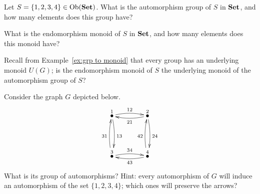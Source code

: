 \documentclass[CT4S-EN-RU]{subfiles}
\begin{document}
\begin{exampleRUS}
\end{exampleRUS}

\begin{exerciseENG}
Let $S=\{1,2,3,4\}\in\textnormal{Ob}({\mathbf{Set}})$.
\sexc What is the automorphism group of $S$ in ${\mathbf{Set}}$, and how many elements does this group have?
\item What is the endomorphism monoid of $S$ in ${\mathbf{Set}}$, and how many elements does this monoid have? 
\item Recall from Example~\ref{ex:grp to monoid} that every group has an underlying monoid $U(G)$; is the endomorphism monoid of $S$ the underlying monoid of the automorphism group of $S$?
\endsexc
\end{exerciseENG}

\begin{exerciseRUS}
\end{exerciseRUS}

\begin{exerciseENG}\label{exc:symmetric square}
Consider the graph $G$ depicted below. 
$$
\xymatrix@=40pt{
\LMO{1}\ar@/^.3pc/[r]^{12}\ar@/^.3pc/[d]^{13}&\LMO{2}\ar@/^.3pc/[d]^{24}\ar@/^.3pc/[l]^{21}\\
\LMO{3}\ar@/^.3pc/[r]^{34}\ar@/^.3pc/[u]^{31}&\LMO{4}\ar@/^.3pc/[u]^{42}\ar@/^.3pc/[l]^{43}
}
$$
What is its group of automorphisms? Hint: every automorphism of $G$ will induce an automorphism of the set $\{1,2,3,4\}$; which ones will preserve the arrows?
\end{exerciseENG}

\begin{exerciseRUS}\label{exc:symmetric square}
\end{exerciseRUS}


\subsubsection{}\label{sec:preorder as cat}
\end{document}
